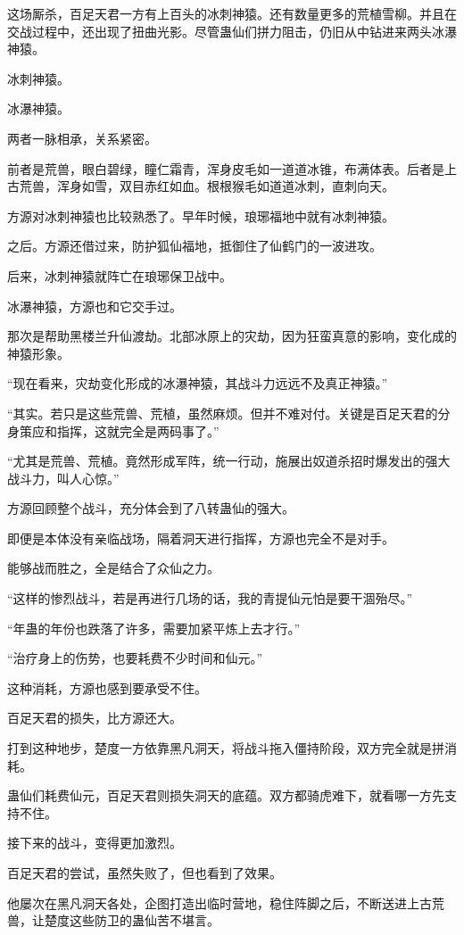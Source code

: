 \begin{this_body}
这场厮杀，百足天君一方有上百头的冰刺神猿。还有数量更多的荒植雪柳。并且在交战过程中，还出现了扭曲光影。尽管蛊仙们拼力阻击，仍旧从中钻进来两头冰瀑神猿。

冰刺神猿。

冰瀑神猿。

两者一脉相承，关系紧密。

前者是荒兽，眼白碧绿，瞳仁霜青，浑身皮毛如一道道冰锥，布满体表。后者是上古荒兽，浑身如雪，双目赤红如血。根根猴毛如道道冰刺，直刺向天。

方源对冰刺神猿也比较熟悉了。早年时候，琅琊福地中就有冰刺神猿。

之后。方源还借过来，防护狐仙福地，抵御住了仙鹤门的一波进攻。

后来，冰刺神猿就阵亡在琅琊保卫战中。

冰瀑神猿，方源也和它交手过。

那次是帮助黑楼兰升仙渡劫。北部冰原上的灾劫，因为狂蛮真意的影响，变化成的神猿形象。

“现在看来，灾劫变化形成的冰瀑神猿，其战斗力远远不及真正神猿。”

“其实。若只是这些荒兽、荒植，虽然麻烦。但并不难对付。关键是百足天君的分身策应和指挥，这就完全是两码事了。”

“尤其是荒兽、荒植。竟然形成军阵，统一行动，施展出奴道杀招时爆发出的强大战斗力，叫人心惊。”

方源回顾整个战斗，充分体会到了八转蛊仙的强大。

即便是本体没有亲临战场，隔着洞天进行指挥，方源也完全不是对手。

能够战而胜之，全是结合了众仙之力。

“这样的惨烈战斗，若是再进行几场的话，我的青提仙元怕是要干涸殆尽。”

“年蛊的年份也跌落了许多，需要加紧平炼上去才行。”

“治疗身上的伤势，也要耗费不少时间和仙元。”

这种消耗，方源也感到要承受不住。

百足天君的损失，比方源还大。

打到这种地步，楚度一方依靠黑凡洞天，将战斗拖入僵持阶段，双方完全就是拼消耗。

蛊仙们耗费仙元，百足天君则损失洞天的底蕴。双方都骑虎难下，就看哪一方先支持不住。

接下来的战斗，变得更加激烈。

百足天君的尝试，虽然失败了，但也看到了效果。

他屡次在黑凡洞天各处，企图打造出临时营地，稳住阵脚之后，不断送进上古荒兽，让楚度这些防卫的蛊仙苦不堪言。


\end{this_body}
